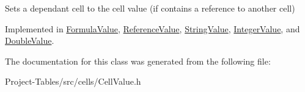 Sets a dependant cell to the cell value (if contains a reference to another cell) 

Implemented in \hyperlink{classFormulaValue_a0532fb20f1ea829fd8ec7fa32c96105a}{Formula\+Value}, \hyperlink{classReferenceValue_a28ae7e6bd74fa18735456be37c866804}{Reference\+Value}, \hyperlink{classStringValue_a652b9f611082953f3f6f3938657793d1}{String\+Value}, \hyperlink{classIntegerValue_a3bd7ab4408d25b74225931d89f62ac8b}{Integer\+Value}, and \hyperlink{classDoubleValue_a59437f80b42c8f3c058b87002e1fe0ec}{Double\+Value}.



The documentation for this class was generated from the following file\+:\begin{DoxyCompactItemize}
\item 
Project-\/\+Tables/src/cells/Cell\+Value.\+h\end{DoxyCompactItemize}
